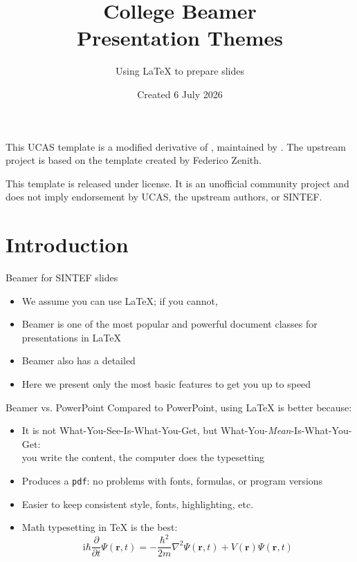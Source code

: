 \documentclass[aspectratio=169]{beamer}
\title{College Beamer\\Presentation Themes}
\subtitle{Using \LaTeX{} to prepare slides}
\author{}
\date{Created 6 July 2026}
\begin{document}
\maketitle

\begin{frame}
  \vspace*{1.25cm}
  This UCAS template is a modified derivative of
  ,
  maintained by .
  The upstream project is based on the
  template created by Federico Zenith.

  This template is released under
  license. It is an unofficial community project and does not imply
  endorsement by UCAS, the upstream authors, or SINTEF.
\end{frame}

\section{Introduction}

\begin{frame}{Beamer for SINTEF slides}
  \begin{itemize}
    \item We assume you can use \LaTeX; if you cannot,
    \item Beamer is one of the most popular and powerful document classes for
      presentations in \LaTeX
    \item Beamer also has a detailed
    \item Here we present only the most basic features to get you up to speed
  \end{itemize}
\end{frame}

\begin{frame}{Beamer vs. PowerPoint}
  Compared to PowerPoint, using \LaTeX{} is better because:
  \begin{itemize}
    \item It is not What-You-See-Is-What-You-Get, but
      What-You-\emph{Mean}-Is-What-You-Get:\\
      you write the content, the computer does the typesetting
    \item Produces a \texttt{pdf}: no problems with fonts, formulas, or program versions
    \item Easier to keep consistent style, fonts, highlighting, etc.
    \item Math typesetting in \TeX{} is the best:
      \begin{equation*}
        \mathrm{i}\hbar\frac{\partial}{\partial t}\Psi(\mathbf{r},t)
        = -\frac{\hbar^2}{2m}\nabla^2\Psi(\mathbf{r},t)
        + V(\mathbf{r})\Psi(\mathbf{r},t)
      \end{equation*}
  \end{itemize}
\end{frame}
\end{document}
